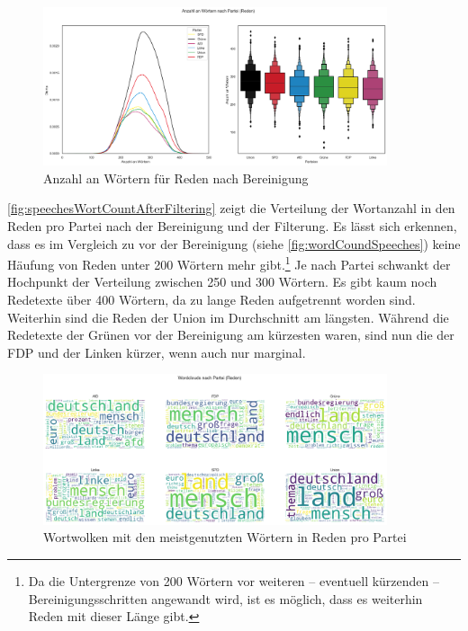 \begin{figure}[H]
    \centering
    \includegraphics[width=0.9\textwidth]{data/images/speeches/speeches_word_count_after_filter.png}
    \caption{Anzahl an Wörtern für Reden nach Bereinigung} \label{fig:speechesWortCountAfterFiltering}
\end{figure}

\autoref{fig:speechesWortCountAfterFiltering} zeigt die Verteilung der Wortanzahl in den Reden pro Partei nach der Bereinigung und der Filterung. Es lässt sich erkennen, dass es im Vergleich zu vor der Bereinigung (siehe \autoref{fig:wordCoundSpeeches}) keine Häufung von Reden unter \num{200} Wörtern mehr gibt.\footnote{Da die Untergrenze von \num{200} Wörtern vor weiteren -- eventuell kürzenden -- Bereinigungsschritten angewandt wird, ist es möglich, dass es weiterhin Reden mit dieser Länge gibt.} Je nach Partei schwankt der Hochpunkt der Verteilung zwischen \num{250} und \num{300} Wörtern. Es gibt kaum noch Redetexte über \num{400} Wörtern, da zu lange Reden aufgetrennt worden sind. Weiterhin sind die Reden der Union im Durchschnitt am längsten. Während die Redetexte der Grünen vor der Bereinigung am kürzesten waren, sind nun die der \ac{FDP} und der Linken kürzer, wenn auch nur marginal.

\begin{figure}[H]
    \centering
    \includegraphics[width=0.9\textwidth]{data/images/speeches/speeches_wordclouds.png}
    \caption{Wortwolken mit den meistgenutzten Wörtern in Reden pro Partei} \label{fig:speechesWordclouds}
\end{figure}

